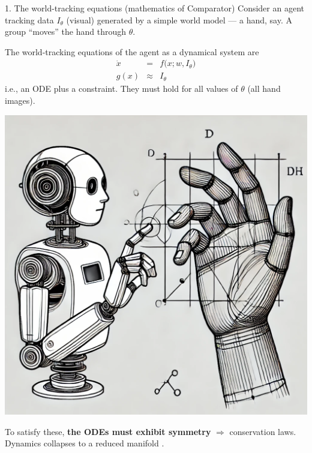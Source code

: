 \begin{frame}{1. The world-tracking equations (mathematics of Comparator)}
Consider an agent tracking  data $I_{\theta}$ (visual) generated by a simple world model --- a hand, say. A group ``moves'' the hand through $\theta$. \vfill

\begin{minipage}{0.5\linewidth}
    The world-tracking equations of the agent as a dynamical system are
    \begin{eqnarray*}\label{eq:WTNE} 
        \dot x &=& f\big(x; w, I_{\theta}\big) \nonumber \\
        g(x)  &\approx &I_{\theta}
    \end{eqnarray*}
    i.e., an ODE plus a constraint. They must hold for all values of $\theta$ (all hand images).
\end{minipage}%
\hfill
\begin{minipage}{0.45\linewidth}
    \centering
    \includegraphics[width=0.6\linewidth]{hand.png}
\end{minipage}
\begin{tcolorbox}[colback=cyan!40, colframe=gray!70,  title={Connecting dynamics and symmetry}]  
To satisfy these,  \textbf{the ODEs must exhibit symmetry} $\Rightarrow$ conservation laws. Dynamics collapses to a reduced manifold \cite{ruffiniStructuredDynamicsAlgorithmic2023}. 
\end{tcolorbox}



\end{frame}


